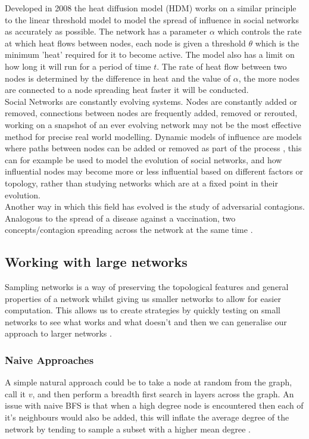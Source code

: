 \documentclass{article}
\begin{document}
Developed in 2008 the heat diffusion model (HDM) works on a similar principle to the linear threshold model to model the spread of influence in social networks as accurately as possible.
The network has a parameter $\alpha$ which controls the rate at which heat flows between nodes, each node is given a threshold $\theta$ which is the minimum 'heat' required for it to become active.
The model also has a limit on how long it will run for a period of time $t$.
The rate of heat flow between two nodes is determined by the difference in heat and the value of $\alpha$, the more nodes are connected to a node spreading heat faster it will be conducted.
\\

Social Networks are constantly evolving systems.
Nodes are constantly added or removed, connections between nodes are frequently added, removed or rerouted, working on a snapshot of an ever evolving network may not be the most effective method for precise real world modelling.
Dynamic models of influence are models where paths between nodes can be added or removed as part of the process \cite{sekara2016fundamental}, this can for example be used to model the evolution of social networks, and how influential nodes may become more or less influential based on different factors or topology, rather than studying networks which are at a fixed point in their evolution.
\\

Another way in which this field has evolved is the study of adversarial contagions.
Analogous to the spread of a disease against a vaccination, two concepts/contagion spreading across the network at the same time \cite{griffiths17LimitiingConcept}.

\subsection{Working with large networks}
Sampling networks is a way of preserving the topological features and general properties of a network whilst giving us smaller networks to allow for easier computation.
This allows us to create strategies by quickly testing on small networks to see what works and what doesn't and then we can generalise our approach to larger networks .

\subsubsection{Naive Approaches}
A simple natural approach could be to take a node at random from the graph, call it $v$, and then perform a breadth first search in layers across the graph.
An issue with naive BFS is that when a high degree node is encountered then each of it's neighbours would also be added, this will inflate the average degree of the network by tending to sample a subset with a higher mean degree \cite{Wang2011UnderstandingGS}.
\\
\end{document}

